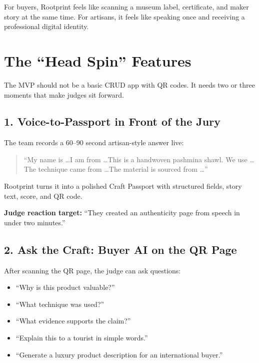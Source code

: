 \documentclass[11pt,a4paper]{article}
\begin{document}
\begin{goldbox}
For buyers, Rootprint feels like scanning a museum label, certificate, and maker story at the same time. For artisans, it feels like speaking once and receiving a professional digital identity.
\end{goldbox}

\section{The ``Head Spin'' Features}

The MVP should not be a basic CRUD app with QR codes. It needs two or three moments that make judges sit forward.

\subsection{1. Voice-to-Passport in Front of the Jury}

The team records a 60--90 second artisan-style answer live:

\begin{quote}
``My name is \ldots I am from \ldots This is a handwoven pashmina shawl. We use \ldots The technique came from \ldots The material is sourced from \ldots''
\end{quote}

Rootprint turns it into a polished Craft Passport with structured fields, story text, score, and QR code.

\begin{blackbox}
\textbf{Judge reaction target:} ``They created an authenticity page from speech in under two minutes.''
\end{blackbox}

\subsection{2. Ask the Craft: Buyer AI on the QR Page}

After scanning the QR page, the judge can ask questions:

\begin{itemize}
  \item ``Why is this product valuable?''
  \item ``What technique was used?''
  \item ``What evidence supports the claim?''
  \item ``Explain this to a tourist in simple words.''
  \item ``Generate a luxury product description for an international buyer.''
\end{itemize}
\end{document}
